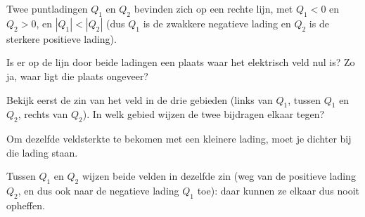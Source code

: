 \documentclass{ximera}
\begin{document}
\begin{question}
    Twee puntladingen $Q_{1}$ en $Q_{2}$ bevinden zich op een rechte lijn, met $Q_{1} < 0$ en $Q_{2} > 0$, en $|Q_{1}| < |Q_{2}|$ (dus $Q_1$ is de zwakkere negatieve lading en $Q_2$ is de sterkere positieve lading).

    \begin{center}
    \end{center}

    Is er op de lijn door beide ladingen een plaats waar het elektrisch veld nul is? Zo ja, waar ligt die plaats ongeveer?

    \begin{multipleChoice}
    \end{multipleChoice}

    \begin{hint}
        Bekijk eerst de zin van het veld in de drie gebieden (links van $Q_1$, tussen $Q_1$ en $Q_2$, rechts van $Q_2$). In welk gebied wijzen de twee bijdragen elkaar tegen?
    \end{hint}
    \begin{hint}
        Om dezelfde veldsterkte te bekomen met een kleinere lading, moet je dichter bij die lading staan.
    \end{hint}

    \begin{solution}\nl
        Tussen $Q_1$ en $Q_2$ wijzen beide velden in dezelfde zin (weg van de positieve lading $Q_2$, en dus ook naar de negatieve lading $Q_1$ toe): daar kunnen ze elkaar dus nooit opheffen.


\end{solution}
\end{question}
\end{document}
